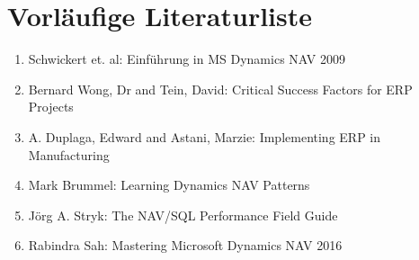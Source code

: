 \chapter{Vorläufige Literaturliste}

\begin{enumerate}	
	\item Schwickert et. al: Einführung in MS Dynamics NAV 2009
	\item Bernard Wong, Dr and Tein, David: Critical Success Factors for ERP Projects	
	\item A. Duplaga, Edward and Astani, Marzie: Implementing ERP in Manufacturing
	\item Mark Brummel: Learning Dynamics NAV Patterns
	\item Jörg A. Stryk: The NAV/SQL Performance Field Guide
	\item Rabindra Sah: Mastering Microsoft Dynamics NAV 2016
\end{enumerate}

